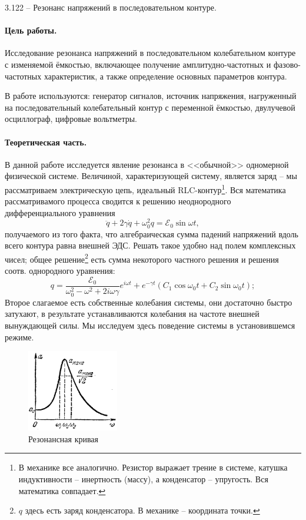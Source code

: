 \documentclass{../lab_class}
\newcommand{\ef}{\mathscr{E}}
\begin{document}
{\Large 3.122 -- Резонанс напряжений в последовательном контуре.}

\paragraph{Цель работы.}
Исследование резонанса напряжений в последовательном колебательном контуре с изменяемой ёмкостью, включающее получение амплитудно-частотных и фазово-частотных характеристик, а также определение основных параметров контура.

В работе используются: генератор сигналов, источник напряжения, нагруженный на последовательный колебательный контур с переменной ёмкостью, двулучевой осциллограф, цифровые вольтметры.

\paragraph{Теоретическая часть.}
В данной работе исследуется явление резонанса в <<обычной>> одномерной физической системе. Величиной, характеризующей систему, является заряд -- мы рассматриваем электрическую цепь, идеальный RLC-контур\footnote{В механике все аналогично. Резистор выражает трение в системе, катушка индуктивности -- инертность (массу), а конденсатор -- упругость. Вся математика совпадает.}. Вся математика рассматривамого процесса сводится к решению неоднородного дифференциального уравнения
\begin{equation}
	\ddot{q} + 2 \gamma \dot{q} + \omega_0^2 q = \ef_0 \sin \omega t,
\end{equation}
получаемого из того факта, что алгебраическая сумма падений напряжений вдоль всего контура равна внешней ЭДС.
Решать такое удобно над полем комплексных чисел; общее решение\footnote{$q$ здесь есть заряд конденсатора. В механике -- координата точки.} есть сумма некоторого частного решения и решения соотв. однородного уравнения: 
\begin{equation}
	q = \frac{\ef_0}{\omega^2_0 - \omega^2 + 2 i \omega \gamma} e^{i \omega t} + e^{-\gamma t} ( C_1 \cos{\omega_0 t} + C_2 \sin{\omega_0 t} );
\end{equation}
Второе слагаемое есть собственные колебания системы, они достаточно быстро затухают, в результате устанавливаются колебания на частоте внешней вынуждающей силы. Мы исследуем здесь поведение системы в установившемся режиме.

\begin{figure}
	\centering
	\includegraphics[width=4cm]{res_curve.png}
	\caption{Резонансная кривая}
\end{figure}
\end{document}
